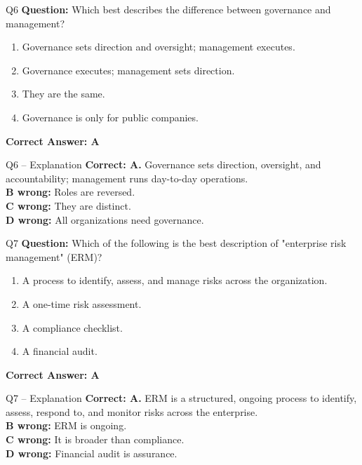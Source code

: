 \documentclass[aspectratio=169,10pt]{beamer}
\begin{document}
	\begin{frame}[t]{Q6}
		\small
		\textbf{Question:} Which best describes the difference between governance and management?
		\begin{enumerate}[label=\Alph*.,itemsep=1pt,topsep=2pt]
			\item Governance sets direction and oversight; management executes.
			\item Governance executes; management sets direction.
			\item They are the same.
			\item Governance is only for public companies.
		\end{enumerate}
		\vspace{4pt}
		\textbf{Correct Answer: A}
	\end{frame}
	
	\begin{frame}[t]{Q6 -- Explanation}
		\small
		\textbf{Correct: A.} Governance sets direction, oversight, and accountability; management runs day-to-day operations. \\[4pt]
		\textbf{B wrong:} Roles are reversed. \\[2pt]
		\textbf{C wrong:} They are distinct. \\[2pt]
		\textbf{D wrong:} All organizations need governance.
	\end{frame}
	
	\begin{frame}[t]{Q7}
		\small
		\textbf{Question:} Which of the following is the best description of "enterprise risk management" (ERM)?
		\begin{enumerate}[label=\Alph*.,itemsep=1pt,topsep=2pt]
			\item A process to identify, assess, and manage risks across the organization.
			\item A one-time risk assessment.
			\item A compliance checklist.
			\item A financial audit.
		\end{enumerate}
		\vspace{4pt}
		\textbf{Correct Answer: A}
	\end{frame}
	
	\begin{frame}[t]{Q7 -- Explanation}
		\small
		\textbf{Correct: A.} ERM is a structured, ongoing process to identify, assess, respond to, and monitor risks across the enterprise. \\[4pt]
		\textbf{B wrong:} ERM is ongoing. \\[2pt]
		\textbf{C wrong:} It is broader than compliance. \\[2pt]
		\textbf{D wrong:} Financial audit is assurance.
	\end{frame}
	
\end{document}
